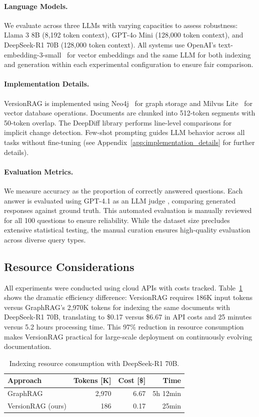 \paragraph{Language Models.}
We evaluate across three LLMs with varying capacities to assess robustness: Llama 3 8B (8,192 token context), GPT-4o Mini (128,000 token context), and DeepSeek-R1 70B (128,000 token context). All systems use OpenAI's text-embedding-3-small~\cite{openai2024embedding} for vector embeddings and the same LLM for both indexing and generation within each experimental configuration to ensure fair comparison.

\paragraph{Implementation Details.}
VersionRAG is implemented using Neo4j~\cite{neo4j2025} for graph storage and Milvus Lite~\cite{milvuslite2025} for vector database operations. Documents are chunked into 512-token segments with 50-token overlap. The DeepDiff library \cite{Dehpour_DeepDiff} performs line-level comparisons for implicit change detection. Few-shot prompting guides LLM behavior across all tasks without fine-tuning (see Appendix~\ref{app:implementation_details} for further details).

\paragraph{Evaluation Metrics.}
We measure accuracy as the proportion of correctly answered questions. Each answer is evaluated using GPT-4.1 as an LLM judge \cite{gu2025surveyllmasajudge}, comparing generated responses against ground truth. This automated evaluation is manually reviewed for all 100 questions to ensure reliability. While the dataset size precludes extensive statistical testing, the manual curation ensures high-quality evaluation across diverse query types.

\subsection{Resource Considerations}

All experiments were conducted using cloud APIs with costs tracked. Table~\ref{tab:indexingcosts} shows the dramatic efficiency difference: VersionRAG requires 186K input tokens versus GraphRAG's 2,970K tokens for indexing the same documents with DeepSeek-R1 70B, translating to \$0.17 versus \$6.67 in API costs and 25 minutes versus 5.2 hours processing time. This 97\% reduction in resource consumption makes VersionRAG practical for large-scale deployment on continuously evolving documentation.

\begin{table}[hb]
\centering
\footnotesize
\caption{Indexing resource consumption with DeepSeek-R1 70B.}
\begin{tabular}{lrrr}
\hline
Approach & Tokens [K] & Cost [\$] & Time \\ \hline
GraphRAG & 2,970 & 6.67 & 5h 12min \\
VersionRAG (ours) & 186 & 0.17 & 25min \\
\hline
\end{tabular}
\label{tab:indexingcosts}
\end{table}
